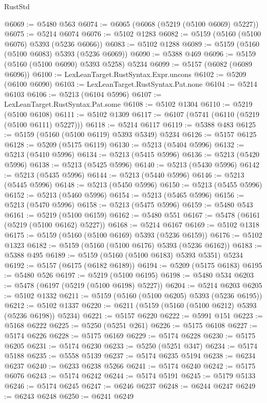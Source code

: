 \begin{lexlean}{RustStd}
\begin{coremodule}
@6069 := @5480 @563
@6074 := @6065 (@6068 (@5219 (@5100 @6069) @5227))
@6075 := @5214 @6074
@6076 := @5102 @1283
@6082 := @5159 (@5160 (@5100 @6076) @5393 (@5236 @6066))
@6083 := @5102 @1288
@6089 := @5159 (@5160 (@5100 @6083) @5393 (@5236 @6069))
@6090 := @5388 @469
@6096 := @5159 (@5160 (@5100 @6090) @5393 @5258) @5234
@6099 := @5157 (@6082 (@6089 @6096))
@6100 := LexLeanTarget.RustSyntax.Expr.uncons
@6102 := @5209 (@6100 @6090)
@6103 := LexLeanTarget.RustSyntax.Pat.none
@6104 := @5214 @6103
@6106 := @5213 (@6104 @5996)
@6107 := LexLeanTarget.RustSyntax.Pat.some
@6108 := @5102 @1304
@6110 := @5219 (@5100 @6108)
@6111 := @5102 @1309
@6117 := @6107 (@5741 (@6110 (@5219 (@5100 @6111) @5227)))
@6118 := @5214 @6117
@6119 := @5388 @483
@6125 := @5159 (@5160 (@5100 @6119) @5393 @5349) @5234
@6126 := @5157 @6125
@6128 := @5209 (@5175 @6119)
@6130 := @5213 (@5404 @5996)
@6132 := @5213 (@5410 @5996)
@6134 := @5213 (@5415 @5996)
@6136 := @5213 (@5420 @5996)
@6138 := @5213 (@5425 @5996)
@6140 := @5213 (@5430 @5996)
@6142 := @5213 (@5435 @5996)
@6144 := @5213 (@5440 @5996)
@6146 := @5213 (@5445 @5996)
@6148 := @5213 (@5450 @5996)
@6150 := @5213 (@5455 @5996)
@6152 := @5213 (@5460 @5996)
@6154 := @5213 (@5465 @5996)
@6156 := @5213 (@5470 @5996)
@6158 := @5213 (@5475 @5996)
@6159 := @5480 @543
@6161 := @5219 (@5100 @6159)
@6162 := @5480 @551
@6167 := @5478 (@6161 (@5219 (@5100 @6162) @5227))
@6168 := @5214 @6167
@6169 := @5102 @1318
@6175 := @5159 (@5160 (@5100 @6169) @5393 (@5236 @6159))
@6176 := @5102 @1323
@6182 := @5159 (@5160 (@5100 @6176) @5393 (@5236 @6162))
@6183 := @5388 @495
@6189 := @5159 (@5160 (@5100 @6183) @5393 @5351) @5234
@6192 := @5157 (@6175 (@6182 @6189))
@6194 := @5209 (@5175 @6183)
@6195 := @5480 @526
@6197 := @5219 (@5100 @6195)
@6198 := @5480 @534
@6203 := @5478 (@6197 (@5219 (@5100 @6198) @5227))
@6204 := @5214 @6203
@6205 := @5102 @1332
@6211 := @5159 (@5160 (@5100 @6205) @5393 (@5236 @6195))
@6212 := @5102 @1337
@6220 := @6211 (@5159 (@5160 (@5100 @6212) @5393 (@5236 @6198)) @5234)
@6221 := @5157 @6220
@6222 := @5991 @151
@6223 := @5168 @6222
@6225 := @5250 (@5251 @261)
@6226 := @5175 @6108
@6227 := @5174 @6226
@6228 := @5175 @6169
@6229 := @5174 @6228
@6230 := @5175 @6205
@6231 := @5174 @6230
@6233 := @5250 (@5251 @347)
@6234 := @5174 @5188
@6235 := @5558 @5139
@6237 := @5174 @6235 @5194
@6238 := @6234 @6237
@6240 := @6233 @6238 @5266
@6241 := @5174 @6240
@6242 := @5175 @6076
@6243 := @5174 @6242
@6244 := @5174 @5191
@6245 := @5179 @5133
@6246 := @5174 @6245
@6247 := @6246 @6237
@6248 := @6244 @6247
@6249 := @6243 @6248
@6250 := @6241 @6249

\end{coremodule}
\end{lexlean}
